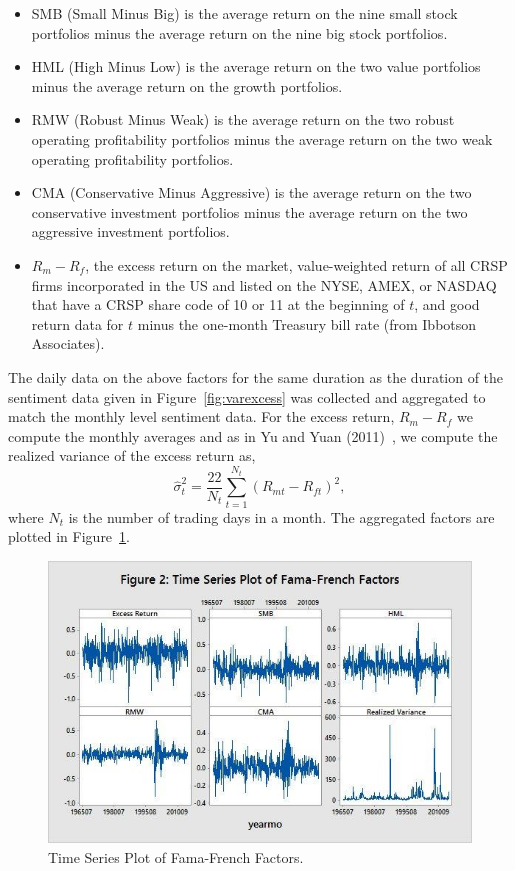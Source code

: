 \begin{itemize}
\item SMB (Small Minus Big) is the average return on the nine small stock portfolios minus the average return on the nine big stock portfolios.

\item HML (High Minus Low) is the average return on the two value portfolios minus the average return on the growth portfolios.

\item RMW (Robust Minus Weak) is the average return on the two robust operating profitability portfolios minus the average return on the two weak operating profitability portfolios.

\item CMA (Conservative Minus Aggressive) is the average return on the two conservative investment portfolios minus the average return on the two aggressive investment portfolios.

\item $R_m - R_f$, the excess return on the market, value-weighted return of all CRSP firms incorporated in the US and listed on the NYSE, AMEX, or NASDAQ that have a CRSP share code of 10 or 11 at the beginning of $t$, and good return data for $t$ minus the one-month Treasury bill rate (from Ibbotson Associates).
\end{itemize}


The daily data on the above factors for the same duration as the duration of the sentiment data given in Figure~\ref{fig:varexcess} was collected and aggregated to match the monthly level sentiment data. For the excess return, $R_m-R_f$ we compute the monthly averages and as in Yu and Yuan (2011)~\cite{yuyuan}, we compute the realized variance of the excess return as,
	\begin{equation} \label{fig:varexcess}
	\widehat{\sigma}_t^2=\frac{22}{N_t}\sum_{t=1}^{N_t}(R_{mt}-R_{ft})^2,
	\end{equation}
where $N_t$ is the number of trading days in a month. The aggregated factors are plotted in Figure~\ref{fig:timefamafrench}.
 
 
	\begin{figure}[!ht]
	\centering
	\includegraphics[width=\textwidth]{chapters/chapter_news_an/figures/ch4sec1famafrench.jpg}
	\caption{Time Series Plot of Fama-French Factors.\label{fig:timefamafrench}}
	\end{figure}


